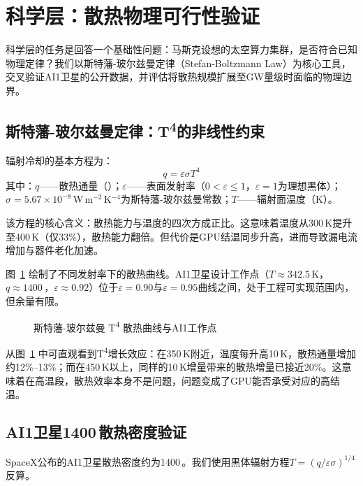 
\section{科学层：散热物理可行性验证}

科学层的任务是回答一个基础性问题：马斯克设想的太空算力集群，是否符合已知物理定律？我们以斯特藩-玻尔兹曼定律（Stefan-Boltzmann Law）为核心工具，交叉验证AI1卫星的公开数据，并评估将散热规模扩展至GW量级时面临的物理边界。

\subsection{斯特藩-玻尔兹曼定律：T\textsuperscript{4}的非线性约束}

辐射冷却的基本方程为：
\begin{equation}
q = \varepsilon\sigma T^{4}
\end{equation}
其中：$q$——散热通量（\unitWpm{}）；$\varepsilon$——表面发射率（$0<\varepsilon\leq 1$，$\varepsilon=1$为理想黑体）；$\sigma=5.67\times10^{-8}$\,W\,m$^{-2}$\,K$^{-4}$为斯特藩-玻尔兹曼常数；$T$——辐射面温度（K）。

该方程的核心含义：散热能力与温度的四次方成正比。这意味着温度从300\,K提升至400\,K（仅33\%），散热能力翻倍。但代价是GPU结温同步升高，进而导致漏电流增加与器件老化加速。

图~\ref{fig:sb_t4} 绘制了不同发射率下的散热曲线。AI1卫星设计工作点（$T\approx342.5$\,K，$q\approx1400$\,\unitWpm{}，$\varepsilon\approx 0.92$）位于$\varepsilon=0.90$与$\varepsilon=0.95$曲线之间，处于工程可实现范围内，但余量有限。

\begin{figure}[H]
\centering

\caption{斯特藩-玻尔兹曼 T\textsuperscript{4} 散热曲线与AI1工作点}
\label{fig:sb_t4}
\end{figure}

从图~\ref{fig:sb_t4} 中可直观看到T\textsuperscript{4}增长效应：在350\,K附近，温度每升高10\,K，散热通量增加约12\%--13\%；而在450\,K以上，同样的10\,K增量带来的散热增量已接近20\%。这意味着在高温段，散热效率本身不是问题，问题变成了GPU能否承受对应的高结温。

\subsection{AI1卫星1400\,\unitWpm{}散热密度验证}

SpaceX公布的AI1卫星散热密度约为1400\,\unitWpm{}\cite{spacex2026ai1}。我们使用黑体辐射方程$T=(q/\varepsilon\sigma)^{1/4}$反算。

